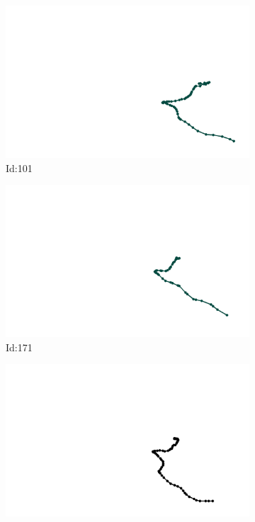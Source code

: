 \documentclass[12pt,twoside]{report}
\begin{document}
\begin{figure}
\centering
\begin{subfigure}[b]{0.20\textwidth}
\centering
\includegraphics[width=\textwidth]{../../trajectories/101.png}
\caption{Id:101}
\end{subfigure}
\begin{subfigure}[b]{0.20\textwidth}
\centering
\includegraphics[width=\textwidth]{../../trajectories/171.png}
\caption{Id:171}
\end{subfigure}
\begin{subfigure}[b]{0.20\textwidth}
\centering
\includegraphics[width=\textwidth]{../../trajectories/301.png}

\end{subfigure}
\end{figure}
\end{document}

